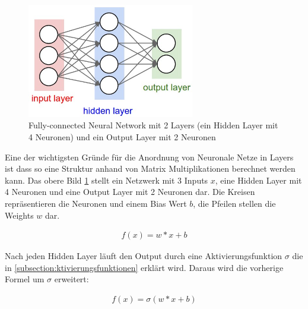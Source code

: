 \begin{figure}[H]
  \centering
  \includegraphics[width=0.65\textwidth]{resources/nn/neural_net.jpeg}
  \caption{
    Fully-connected Neural Network mit 2 Layers (ein Hidden Layer mit 4 Neuronen) und ein Output Layer mit 2 Neuronen 
    \cite{fully-connected-neural-network}
  }
  \label{image:neuronal-network}
\end{figure}

Eine der wichtigsten Gründe für die Anordnung von Neuronale Netze in Layers ist dass so eine Struktur anhand von Matrix Multiplikationen
berechnet werden kann. Das obere Bild \ref{image:neuronal-network} stellt ein Netzwerk mit 3 Inputs $ x $, eine Hidden Layer mit 4 Neuronen
und eine Output Layer mit 2
Neuronen dar. Die Kreisen repräsentieren die Neuronen und einem Bias Wert $ b $, die Pfeilen stellen die Weights $ w $ dar.

\begin{align}
  f(x) = w*x + b
\end{align}

Nach jeden Hidden Layer läuft den Output durch eine Aktivierungsfunktion $ \sigma $ die in \ref{subsection:ktivierungsfunktionen} erklärt wird.
Daraus wird die vorherige Formel um $ \sigma $ erweitert:

\begin{align}
  f(x) = \sigma( w*x + b)
\end{align}




